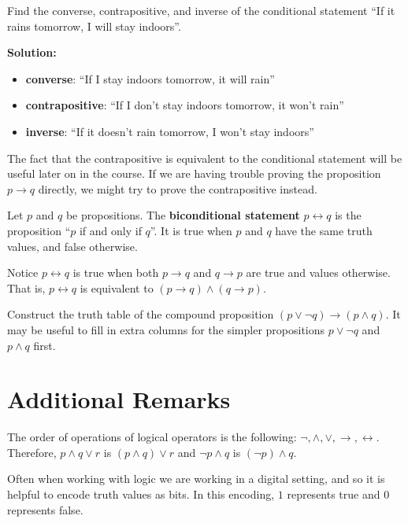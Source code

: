 \documentclass[12t]{scrartcl}
\theoremstyle{plain}
\theoremstyle{definition}
\begin{document}
\example Find the converse, contrapositive, and inverse of the conditional statement ``If it rains tomorrow, I will stay indoors''.

\vspace{0cm}
\textbf{Solution:}
\begin{itemize}[nosep]
    \item \textbf{converse}: ``If I stay indoors tomorrow, it will rain''
    \item \textbf{contrapositive}: ``If I don't stay indoors tomorrow, it won't rain''
    \item \textbf{inverse}: ``If it doesn't rain tomorrow, I won't stay indoors''
\end{itemize}

The fact that the contrapositive is equivalent to the conditional statement will be useful later on in the course. If we are having trouble proving the proposition $p\rightarrow q$ directly, we might try to prove the contrapositive instead.

 Let $p$ and $q$ be propositions. The \textbf{biconditional statement} $p\leftrightarrow q$ is the proposition ``$p$ if and only if $q$''. It is true when $p$ and $q$ have the same truth values, and false otherwise.

Notice $p\leftrightarrow q$ is true when both $p\rightarrow q$ and $q\rightarrow p$ are true and values otherwise. That is, $p\leftrightarrow q$ is equivalent to $(p\rightarrow q)\wedge(q\rightarrow p)$.

\exercise Construct the truth table of the compound proposition $(p\vee\neg q)\rightarrow (p\wedge q)$. It may be useful to fill in extra columns for the simpler propositions $p\vee\neg q$ and $p\wedge q$ first.

\section{Additional Remarks}
The order of operations of logical operators is the following: $\neg,\wedge,\vee,\rightarrow,\leftrightarrow$. Therefore, $p\wedge q\vee r$ is $(p\wedge q)\vee r$ and $\neg p\wedge q$ is $(\neg p)\wedge q$.

\vspace{.25cm}
Often when working with logic we are working in a digital setting, and so it is helpful to encode truth values as bits. In this encoding, $1$ represents true and $0$ represents false.
\end{document}
